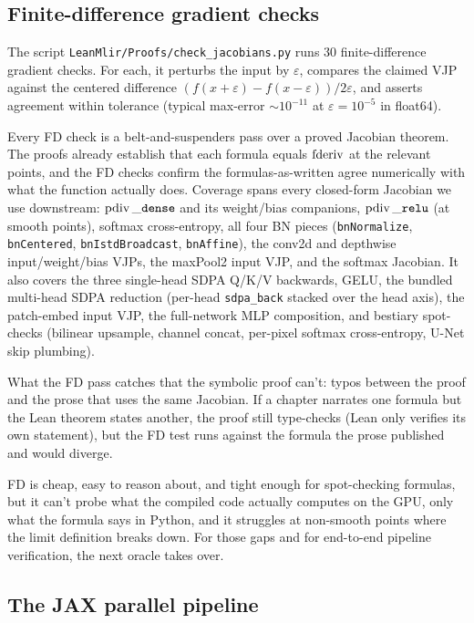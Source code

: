 \subsection{Finite-difference gradient checks}

The script \texttt{LeanMlir/Proofs/check\_jacobians.py} runs 30
finite-difference gradient checks. For each, it perturbs the input by
\(\varepsilon\), compares the claimed VJP against the centered
difference
\((f(x + \varepsilon) - f(x - \varepsilon)) / 2\varepsilon\), and
asserts agreement within tolerance (typical max-error
\(\sim 10^{-11}\) at \(\varepsilon = 10^{-5}\) in float64).

Every FD check is a belt-and-suspenders pass over a
proved Jacobian theorem.
The proofs already establish that each formula equals
\(\operatorname{fderiv}\) at the relevant points, and the FD checks confirm
the formulas-as-written agree numerically with what the function
actually does. Coverage spans every closed-form Jacobian we use
downstream: \(\operatorname{pdiv}\_\texttt{dense}\) and its weight/bias
companions, \(\operatorname{pdiv}\_\texttt{relu}\) (at smooth points),
softmax cross-entropy, all four BN pieces
(\texttt{bnNormalize}, \texttt{bnCentered},
\texttt{bnIstdBroadcast}, \texttt{bnAffine}), the conv2d and
depthwise input/weight/bias VJPs, the maxPool2 input VJP, and the
softmax Jacobian. It also covers the three single-head SDPA Q/K/V
backwards, GELU, the bundled multi-head SDPA reduction (per-head
\texttt{sdpa\_back} stacked over the head axis), the patch-embed
input VJP, the full-network MLP composition, and bestiary
spot-checks (bilinear upsample, channel concat, per-pixel
softmax cross-entropy, U-Net skip plumbing).

What the FD pass catches that the symbolic proof can't: typos
between the proof and the prose that uses the same Jacobian.
If a chapter narrates one formula but the Lean theorem states
another, the proof still type-checks (Lean only verifies its
own statement), but the FD test runs against the formula the
prose published and would diverge.

FD is cheap, easy to reason about, and tight enough for
spot-checking formulas, but it can't probe what the
compiled code actually computes on the GPU, only
what the formula says in Python, and it struggles at
non-smooth points where the limit definition breaks down. For
those gaps and for end-to-end pipeline verification, the next oracle takes over.

\subsection{The JAX parallel pipeline}
\label{sec:jax_pipeline}

